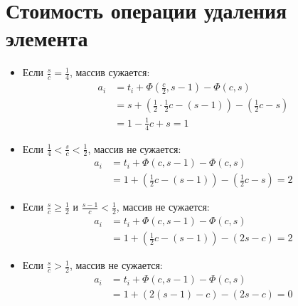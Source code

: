 \documentclass{article}
\begin{document}
\section{Стоимость операции удаления элемента}

\begin{itemize}
    \item Если $\frac{s}{c} = \frac{1}{4}$, массив сужается:
        \begin{align*}
            a_i &= t_i + \Phi\left(\frac{c}{2}, s-1\right) - \Phi(c, s) \\
            &= s + \left(\frac{1}{2} \cdot \frac{1}{2}c - (s-1)\right) - \left(\frac{1}{2}c - s\right) \\
            &= 1 - \frac{1}{4}c + s = 1
        \end{align*}
    
    \item Если $\frac{1}{4} < \frac{s}{c} < \frac{1}{2}$, массив не сужается:
        \begin{align*}
            a_i &= t_i + \Phi(c, s-1) - \Phi(c, s) \\
            &= 1 + \left(\frac{1}{2}c - (s-1)\right) - \left(\frac{1}{2}c - s\right) = 2
        \end{align*}
    
    \item Если $\frac{s}{c} \geqslant \frac{1}{2}$ и $\frac{s-1}{c} < \frac{1}{2}$, массив не сужается:
        \begin{align*}
            a_i &= t_i + \Phi(c, s-1) - \Phi(c, s) \\
            &= 1 + \left(\frac{1}{2}c - (s-1)\right) - (2s - c) = 2
        \end{align*}
    
    \item Если $\frac{s}{c} > \frac{1}{2}$, массив не сужается:
        \begin{align*}
            a_i &= t_i + \Phi(c, s-1) - \Phi(c, s) \\
            &= 1 + (2(s-1) - c) - (2s - c) = 0
        \end{align*}
\end{itemize}
\end{document}
